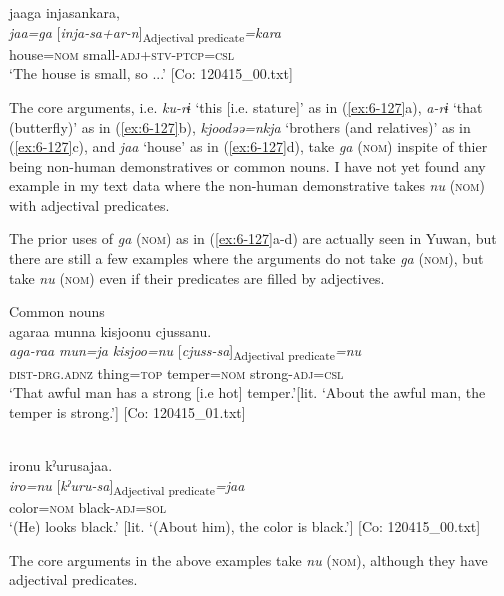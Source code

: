 \begin{styleBeschriftung}
\ex {\TM}  jaaga  injasankara,\\
\glll \textit{jaa=ga}  [\textit{inja-sa+ar-n}]\textsubscript{Adjectival predicate}\textit{=kara}\\
house=\textsc{nom}  small-\textsc{adj}+\textsc{stv}-\textsc{ptcp}=\textsc{csl}\\
\glt ‘The house is small, so ...’ [Co: 120415\_00.txt]
\z

The core arguments, i.e. \textit{ku-rɨ} ‘this [i.e. stature]’ as in (\ref{ex:6-127}a), \textit{a-rɨ} ‘that (butterfly)’ as in (\ref{ex:6-127}b), \textit{kjoodəə=nkja} ‘brothers (and relatives)’ as in (\ref{ex:6-127}c), and \textit{jaa} ‘house’ as in (\ref{ex:6-127}d), take \textit{ga} (\textsc{nom}) inspite of thier being non-human demonstratives or common nouns. I have not yet found any example in my text data where the non-human demonstrative takes \textit{nu} (\textsc{nom}) with adjectival predicates.

The prior uses of \textit{ga} (\textsc{nom}) as in (\ref{ex:6-127}a-d) are actually seen in Yuwan, but there are still a few examples where the arguments do not take \textit{ga} (\textsc{nom}), but take \textit{nu} (\textsc{nom}) even if their predicates are filled by adjectives.

\ea\label{ex:6-128}
 Common nouns\\

 \ea {\TM}  agaraa  munna  kisjoonu  cjussanu.\\
\glll \textit{aga-raa}  \textit{mun=ja}  \textit{kisjoo=nu}  [\textit{cjuss-sa}]\textsubscript{Adjectival predicate}\textit{=nu}\\
\textsc{dist}-\textsc{drg}.\textsc{adnz}  thing=\textsc{top}  temper=\textsc{nom}  strong-\textsc{adj}=\textsc{csl}\\
\glt ‘That awful man has a strong [i.e hot] temper.’[lit. ‘About the awful man, the temper is strong.’]      [Co: 120415\_01.txt]
\z

\ex{}\\
{\TM}
\glll  {\textbar}iro{\textbar}nu  kˀurusajaa.\\
\textit{iro=nu}  [\textit{kˀuru-sa}]\textsubscript{Adjectival predicate}\textit{=jaa}\\
color=\textsc{nom}  black-\textsc{adj}=\textsc{sol}\\
\glt ‘(He) looks black.’ [lit. ‘(About him), the color is black.’]     [Co: 120415\_00.txt]
\z

The core arguments in the above examples take \textit{nu} (\textsc{nom}), although they have adjectival predicates.


\end{styleBeschriftung}
